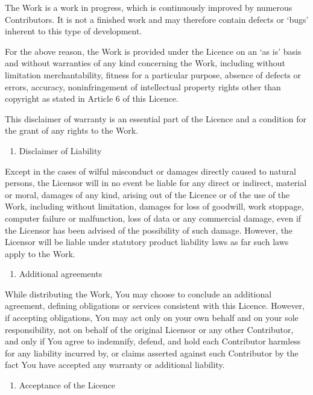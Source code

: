\documentclass[letterpaper,10pt,english]{sphinxmanual}
\begin{document}
\sphinxAtStartPar
The Work is a work in progress, which is continuously improved by numerous
Contributors. It is not a finished work and may therefore contain defects or
‘bugs’ inherent to this type of development.

\sphinxAtStartPar
For the above reason, the Work is provided under the Licence on an ‘as is’ basis
and without warranties of any kind concerning the Work, including without
limitation merchantability, fitness for a particular purpose, absence of defects
or errors, accuracy, non\sphinxhyphen{}infringement of intellectual property rights other than
copyright as stated in Article 6 of this Licence.

\sphinxAtStartPar
This disclaimer of warranty is an essential part of the Licence and a condition
for the grant of any rights to the Work.
\begin{enumerate}
%
\setcounter{enumi}{7}
\item {} 
\sphinxAtStartPar
Disclaimer of Liability

\end{enumerate}

\sphinxAtStartPar
Except in the cases of wilful misconduct or damages directly caused to natural
persons, the Licensor will in no event be liable for any direct or indirect,
material or moral, damages of any kind, arising out of the Licence or of the use
of the Work, including without limitation, damages for loss of goodwill, work
stoppage, computer failure or malfunction, loss of data or any commercial
damage, even if the Licensor has been advised of the possibility of such damage.
However, the Licensor will be liable under statutory product liability laws as
far such laws apply to the Work.
\begin{enumerate}
%
\setcounter{enumi}{8}
\item {} 
\sphinxAtStartPar
Additional agreements

\end{enumerate}

\sphinxAtStartPar
While distributing the Work, You may choose to conclude an additional agreement,
defining obligations or services consistent with this Licence. However, if
accepting obligations, You may act only on your own behalf and on your sole
responsibility, not on behalf of the original Licensor or any other Contributor,
and only if You agree to indemnify, defend, and hold each Contributor harmless
for any liability incurred by, or claims asserted against such Contributor by
the fact You have accepted any warranty or additional liability.
\begin{enumerate}
%
\setcounter{enumi}{9}
\item {} 
\sphinxAtStartPar
Acceptance of the Licence

\end{enumerate}
\end{document}
